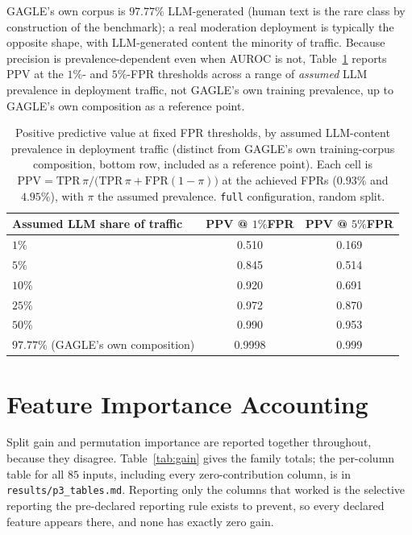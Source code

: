 \documentclass{article}
\newcommand{\arm}[1]{\texttt{#1}}
\begin{document}
GAGLE's own corpus is $97.77\%$ LLM-generated (human text is the rare class
by construction of the benchmark); a real moderation deployment is typically
the opposite shape, with LLM-generated content the minority of traffic.
Because precision is prevalence-dependent even when AUROC is not,
Table~\ref{tab:ppv} reports PPV at the $1\%$- and $5\%$-FPR thresholds across
a range of \emph{assumed} LLM prevalence in deployment traffic, not GAGLE's
own training prevalence, up to GAGLE's own composition as a reference point.

\begin{table}[h]
\centering
\footnotesize
\caption{Positive predictive value at fixed FPR thresholds, by assumed
LLM-content prevalence in deployment traffic (distinct from GAGLE's own
training-corpus composition, bottom row, included as a reference point).
Each cell is
$\mathrm{PPV}=\mathrm{TPR}\,\pi/\big(\mathrm{TPR}\,\pi+\mathrm{FPR}(1-\pi)\big)$
at the achieved FPRs ($0.93\%$ and $4.95\%$), with $\pi$ the assumed prevalence.
\arm{full} configuration, random split.}
\label{tab:ppv}
\begin{tabular}{lcc}
\toprule
Assumed LLM share of traffic & PPV @ $1\%$FPR & PPV @ $5\%$FPR \\
\midrule
$1\%$  & 0.510 & 0.169 \\
$5\%$  & 0.845 & 0.514 \\
$10\%$ & 0.920 & 0.691 \\
$25\%$ & 0.972 & 0.870 \\
$50\%$ & 0.990 & 0.953 \\
$97.77\%$ (GAGLE's own composition) & 0.9998 & 0.999 \\
\bottomrule
\end{tabular}
\end{table}

\section{Feature Importance Accounting}
\label{app:importance}

Split gain and permutation importance are reported together throughout, because
they disagree. Table~\ref{tab:gain} gives the family totals; the per-column
table for all $85$ inputs, including every zero-contribution column, is in
\texttt{results/p3\_tables.md}. Reporting only the columns that worked is the
selective reporting the pre-declared reporting rule exists to prevent, so every
declared feature appears there, and none has exactly zero gain.
\end{document}
